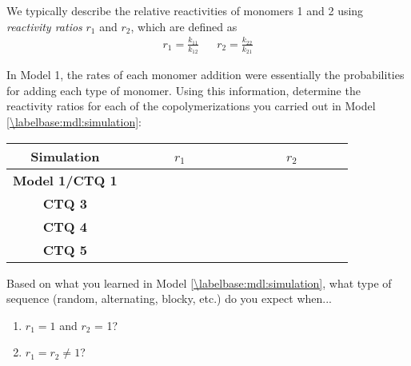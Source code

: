 \begin{activity}[Copolymerization]
\begin{ctqs}
		\begin{solution}[1.5in]
		\end{solution}
	
\end{ctqs}

\begin{infobox}

	We typically  describe the relative reactivities of monomers 1 and 2 using \emph{reactivity ratios} $r_1$ and $r_2$, which are defined as
	\begin{align*}
		r_1 = \frac{k_{11}}{k_{12}} && r_2 = \frac{k_{22}}{k_{21}}
	\end{align*}

\end{infobox}

\begin{ctqs}

	\question In Model 1, the rates of each monomer addition were essentially the probabilities for adding each type of monomer.  Using this information, determine the reactivity ratios for each of the copolymerizations you carried out in Model \ref{\labelbase:mdl:simulation}:
	
		\begin{center}
		\renewcommand{\arraystretch}{2.5}
		\begin{tabular}{|c|c|c|}
			\hline
			\textbf{Simulation} & ~~~~~~$r_1$~~~~~~ & ~~~~~~$r_2$~~~~~~ \\\hline
			\textbf{Model 1/CTQ 1} & & \\\hline
			\textbf{CTQ 3} & & \\\hline
			\textbf{CTQ 4} & & \\\hline
			\textbf{CTQ 5} & & \\\hline
		\end{tabular}
		\end{center}

	\question Based on what you learned in Model \ref{\labelbase:mdl:simulation}, what type of sequence (random, alternating, blocky, etc.) do you expect when...
	
		\begin{enumerate}
			\item $r_1 = 1$ and $r_2$ = 1?
			
				\begin{solution}[0.25in]
				\end{solution}
			
			\item $r_1 = r_2 \neq 1$?
			

\end{enumerate}
\end{ctqs}
\end{activity}
